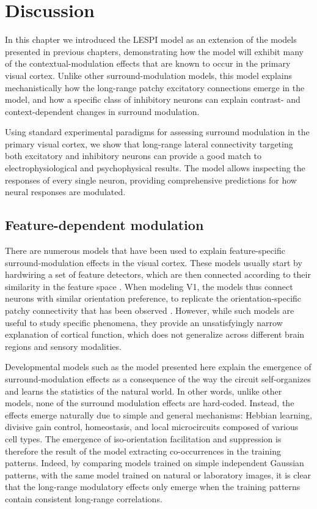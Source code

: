 \section{Discussion}

In this chapter we introduced the LESPI model as an extension of the
models presented in previous chapters, demonstrating how the model
will exhibit many of the contextual-modulation effects that are known
to occur in the primary visual cortex. Unlike other
surround-modulation models, this model explains mechanistically how
the long-range patchy excitatory connections emerge in the model, and
how a specific class of inhibitory neurons can explain contrast- and
context-dependent changes in surround modulation.

Using standard experimental paradigms for assessing surround
modulation in the primary visual cortex, we show that long-range
lateral connectivity targeting both excitatory and inhibitory neurons
can provide a good match to electrophysiological and psychophysical
results. The model allows inspecting the responses of every single
neuron, providing comprehensive predictions for how neural responses
are modulated.

\subsection{Feature-dependent modulation}

There are numerous models that have been used to explain
feature-specific surround-modulation effects in the visual
cortex. These models usually start by hardwiring a set of feature
detectors, which are then connected according to their similarity in the
feature space \citep{Li2002, Schwabe2006}. When modeling V1, the models
thus connect neurons with similar orientation preference, to replicate
the orientation-specific patchy connectivity that has been observed
\cite{Bosking1997}. However, while such models
are useful to study specific phenomena, they provide an unsatisfyingly
narrow explanation of cortical function, which does not generalize
across different brain regions and sensory modalities.

Developmental models such as the model presented here explain the
emergence of surround-modulation effects as a consequence of the way
the circuit self-organizes and learns the statistics of the natural
world. In other words, unlike other models, none of the surround
modulation effects are hard-coded. Instead, the effects emerge
naturally due to simple and general mechanisms: Hebbian learning,
divisive gain control, homeostasis, and local microcircuits composed
of various cell types. The emergence of iso-orientation facilitation
and suppression is therefore the result of the model extracting
co-occurrences in the training patterns. Indeed, by comparing models
trained on simple independent Gaussian patterns, with the same model
trained on natural or laboratory images, it is clear that the
long-range modulatory effects only emerge when the training patterns
contain consistent long-range correlations.

